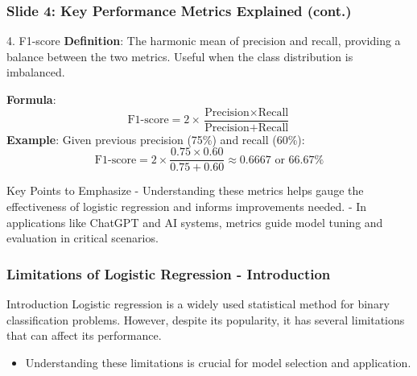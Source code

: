 \documentclass[aspectratio=169]{beamer}
\begin{document}
\begin{frame}[fragile]
    \frametitle{Slide 4: Key Performance Metrics Explained (cont.)}
    \begin{block}{4. F1-score}
        \textbf{Definition}: The harmonic mean of precision and recall, providing a balance between the two metrics. Useful when the class distribution is imbalanced.
        
        \textbf{Formula}:
        \begin{equation}
            \text{F1-score} = 2 \times \frac{\text{Precision} \times \text{Recall}}{\text{Precision} + \text{Recall}}
        \end{equation}
        \textbf{Example}: Given previous precision (75\%) and recall (60\%):
        \begin{equation}
            \text{F1-score} = 2 \times \frac{0.75 \times 0.60}{0.75 + 0.60} \approx 0.6667 \text{ or } 66.67\%
        \end{equation}
    \end{block}

    \begin{block}{Key Points to Emphasize}
        - Understanding these metrics helps gauge the effectiveness of logistic regression and informs improvements needed.
        - In applications like ChatGPT and AI systems, metrics guide model tuning and evaluation in critical scenarios.
    \end{block}
\end{frame}

\begin{frame}[fragile]
    \frametitle{Limitations of Logistic Regression - Introduction}
    \begin{block}{Introduction}
        Logistic regression is a widely used statistical method for binary classification problems. However, despite its popularity, it has several limitations that can affect its performance. 
    \end{block}
    \begin{itemize}
        \item Understanding these limitations is crucial for model selection and application.
    \end{itemize}
\end{frame}
\end{document}
